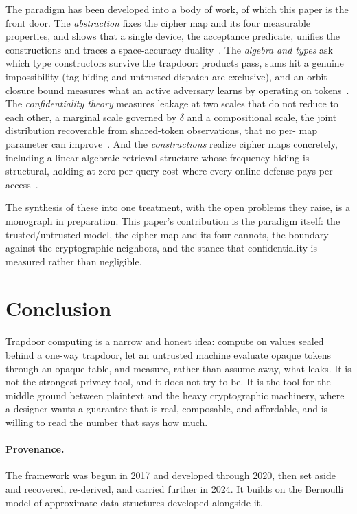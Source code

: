 \documentclass[11pt]{article}
\begin{document}
The paradigm has been developed into a body of work, of which this paper is the
front door. The \emph{abstraction} fixes the cipher map and its four measurable
properties, and shows that a single device, the acceptance predicate, unifies
the constructions and traces a space-accuracy duality~\cite{towell2026cipher}.
The \emph{algebra and types} ask which type constructors survive the trapdoor:
products pass, sums hit a genuine impossibility (tag-hiding and untrusted
dispatch are exclusive), and an orbit-closure bound measures what an active
adversary learns by operating on tokens~\cite{towell2026algebraic}. The
\emph{confidentiality theory} measures leakage at two scales that do not reduce
to each other, a marginal scale governed by $\delta$ and a compositional scale,
the joint distribution recoverable from shared-token observations, that no per-%
map parameter can improve~\cite{towell2026maxconf}. And the \emph{constructions}
realize cipher maps concretely, including a linear-algebraic retrieval structure
whose frequency-hiding is structural, holding at zero per-query cost where every
online defense pays per access~\cite{towell2026codec}.

The synthesis of these into one treatment, with the open problems they raise, is
a monograph in preparation. This paper's contribution is the paradigm itself:
the trusted/untrusted model, the cipher map and its four cannots, the boundary
against the cryptographic neighbors, and the stance that confidentiality is
measured rather than negligible.

\section{Conclusion}

Trapdoor computing is a narrow and honest idea: compute on values sealed behind
a one-way trapdoor, let an untrusted machine evaluate opaque tokens through an
opaque table, and measure, rather than assume away, what leaks. It is not the
strongest privacy tool, and it does not try to be. It is the tool for the
middle ground between plaintext and the heavy cryptographic machinery, where a
designer wants a guarantee that is real, composable, and affordable, and is
willing to read the number that says how much.

\paragraph{Provenance.} The framework was begun in 2017 and developed through
2020, then set aside and recovered, re-derived, and carried further in 2024. It
builds on the Bernoulli model of approximate data structures developed
alongside it.



\end{document}
